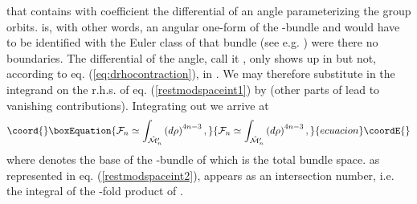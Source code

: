 \documentclass[a4paper,12pt]{article}
\begin{document}
that \myHighlight{$\rho$}\coordHE{} contains with coefficient \coordHE{} the differential of an 
angle parameterizing the \coordHE{} group orbits. \coordHE{} is, with other words, 
an angular one-form of the \coordHE{}-bundle and \coordHE{} 
would have to be identified with the Euler class of that bundle 
(see e.g. \cite{bott}) were there 
no boundaries. The differential of the \coordHE{} angle, call it \myHighlight{$\varphi$}\coordHE{}, 
only shows up in \myHighlight{$\rho$}\coordHE{} but not, according to eq. 
(\ref{eq:drhocontraction}), in \coordHE{}. We may therefore substitute
\myHighlight{$\rho$}\coordHE{} in the integrand on the r.h.s. of eq. 
(\ref{restmodspaceint1}) by \coordHE{} (other parts of \myHighlight{$\rho$}\coordHE{} lead to
vanishing contributions). Integrating out \myHighlight{$\varphi$}\coordHE{} we arrive at 
\begin{equation}\coord{}\boxEquation{
{\cal F}_n \simeq \int_{\hat{{\cal M}}'_n} \left(d\rho \right)^{4n-3}, 
\label{restmodspaceint2}
}{
{\cal F}_n \simeq \int_{\hat{{\cal M}}'_n} \left(d\rho \right)^{4n-3}, 
}{ecuacion}\coordE{}\end{equation}       
where \coordHE{} denotes the base 
of the \coordHE{}-bundle of which \coordHE{} is the total bundle 
space. \coordHE{} as represented in eq. (\ref{restmodspaceint2}), 
appears as an intersection number, i.e. the integral of the 
\coordHE{}-fold product of \coordHE{}.
\end{document}
